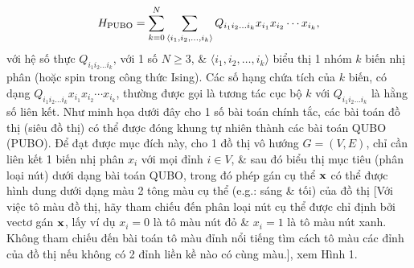 \documentclass{article}
\begin{document}
\begin{itemize}
    \begin{equation*}
        H_{\rm PUBO} = \sum_{k=0}^N\sum_{\langle i_1,i_2,\ldots,i_k\rangle} Q_{i_1i_2\ldots i_k}x_{i_1}x_{i_2}\cdots x_{i_k},
    \end{equation*}
    với hệ số thực $Q_{i_1i_2\ldots i_k}$, với 1 số $N\ge3$, \& $\langle i_1,i_2,\ldots,i_k\rangle$ biểu thị 1 nhóm $k$ biến nhị phân (hoặc spin trong công thức Ising). Các số hạng chứa tích của $k$ biến, có dạng $Q_{i_1i_2\ldots i_k}x_{i_1}x_{i_2}\cdots x_{i_k}$, thường được gọi là tương tác cục bộ $k$ với $Q_{i_1i_2\ldots i_k}$ là hằng số liên kết. Như minh họa dưới đây cho 1 số bài toán chính tắc, các bài toán đồ thị (siêu đồ thị) có thể được đóng khung tự nhiên thành các bài toán QUBO (PUBO). Để đạt được mục đích này, cho 1 đồ thị vô hướng $G = (V,E)$, chỉ cần liên kết 1 biến nhị phân $x_i$ với mọi đỉnh $i\in V$, \& sau đó biểu thị mục tiêu (phân loại nút) dưới dạng bài toán QUBO, trong đó phép gán cụ thể ${\bf x}$ có thể được hình dung dưới dạng màu 2 tông màu cụ thể (e.g.: sáng \& tối) của đồ thị [Với việc tô màu đồ thị, hãy tham chiếu đến phân loại nút cụ thể được chỉ định bởi vectơ gán ${\bf x}$, lấy ví dụ $x_i = 0$ là tô màu nút đỏ \& $x_i = 1$ là tô màu nút xanh. Không tham chiếu đến bài toán tô màu đỉnh nổi tiếng tìm cách tô màu các đỉnh của đồ thị nếu không có 2 đỉnh liền kề nào có cùng màu.], xem {\sf Hình 1.}


\end{itemize}
\end{document}
